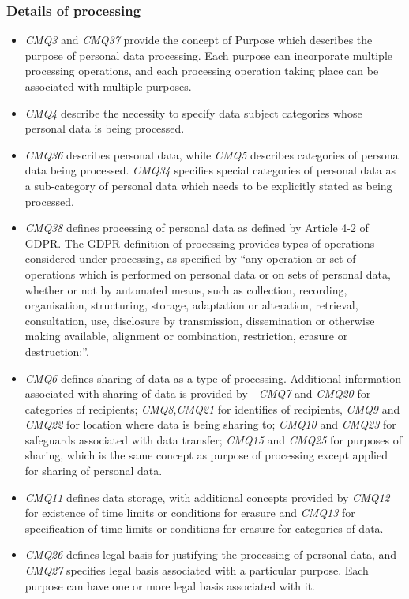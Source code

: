 \subsubsection{Details of processing}
\begin{itemize}
    \item \textit{CMQ3} and \textit{CMQ37} provide the concept of Purpose which describes the purpose of personal data processing. Each purpose can incorporate multiple processing operations, and each processing operation taking place can be associated with multiple purposes.
    \item \textit{CMQ4} describe the necessity to specify data subject categories whose personal data is being processed.
    \item \textit{CMQ36} describes personal data, while \textit{CMQ5} describes categories of personal data being processed. \textit{CMQ34} specifies special categories of personal data as a sub-category of personal data which needs to be explicitly stated as being processed.
    \item \textit{CMQ38} defines processing of personal data as defined by Article 4-2 of GDPR. The GDPR definition of processing provides types of operations considered under processing, as specified by ``any operation or set of operations which is performed on personal data or on sets of personal data, whether or not by automated means, such as collection, recording, organisation, structuring, storage, adaptation or alteration, retrieval, consultation, use, disclosure by transmission, dissemination or otherwise making available, alignment or combination, restriction, erasure or destruction;''.
    \item \textit{CMQ6} defines sharing of data as a type of processing. Additional information associated with sharing of data is provided by - \textit{CMQ7} and \textit{CMQ20} for categories of recipients; \textit{CMQ8},\textit{CMQ21} for identifies of recipients, \textit{CMQ9} and \textit{CMQ22} for location where data is being sharing to; \textit{CMQ10} and \textit{CMQ23} for safeguards associated with data transfer; \textit{CMQ15} and \textit{CMQ25} for purposes of sharing, which is the same concept as purpose of processing except applied for sharing of personal data.
    \item \textit{CMQ11} defines data storage, with additional concepts provided by \textit{CMQ12} for existence of time limits or conditions for erasure and \textit{CMQ13} for specification of time limits or conditions for erasure for categories of data.
    \item \textit{CMQ26} defines legal basis for justifying the processing of personal data, and \textit{CMQ27} specifies legal basis associated with a particular purpose. Each purpose can have one or more legal basis associated with it.
\end{itemize}


